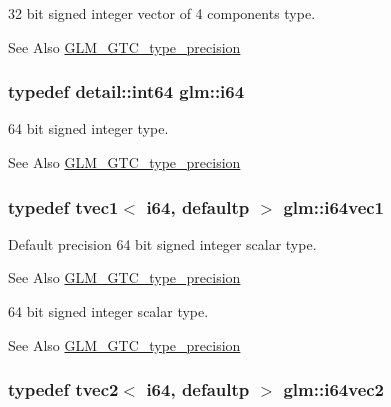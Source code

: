 32 bit signed integer vector of 4 components type. \begin{DoxySeeAlso}{See Also}
\hyperlink{group__gtc__type__precision}{G\-L\-M\-\_\-\-G\-T\-C\-\_\-type\-\_\-precision} 
\end{DoxySeeAlso}
\hypertarget{group__gtc__type__precision_gac7a7eaad46064fc952b06df33689da23}{
\subsubsection[{i64}]{\setlength{\rightskip}{0pt plus 5cm}typedef detail\-::int64 {\bf glm\-::i64}}}\label{group__gtc__type__precision_gac7a7eaad46064fc952b06df33689da23}
64 bit signed integer type. \begin{DoxySeeAlso}{See Also}
\hyperlink{group__gtc__type__precision}{G\-L\-M\-\_\-\-G\-T\-C\-\_\-type\-\_\-precision} 
\end{DoxySeeAlso}
\hypertarget{group__gtc__type__precision_ga7ee2c91a98ebd719ae26e15ad89106de}{
\subsubsection[{i64vec1}]{\setlength{\rightskip}{0pt plus 5cm}typedef tvec1$<$ i64, defaultp $>$ {\bf glm\-::i64vec1}}}\label{group__gtc__type__precision_ga7ee2c91a98ebd719ae26e15ad89106de}
Default precision 64 bit signed integer scalar type. \begin{DoxySeeAlso}{See Also}
\hyperlink{group__gtc__type__precision}{G\-L\-M\-\_\-\-G\-T\-C\-\_\-type\-\_\-precision}
\end{DoxySeeAlso}
64 bit signed integer scalar type. \begin{DoxySeeAlso}{See Also}
\hyperlink{group__gtc__type__precision}{G\-L\-M\-\_\-\-G\-T\-C\-\_\-type\-\_\-precision} 
\end{DoxySeeAlso}
\hypertarget{group__gtc__type__precision_ga5a03cb457be28a9a8b9e61163fe648a1}{
\subsubsection[{i64vec2}]{\setlength{\rightskip}{0pt plus 5cm}typedef tvec2$<$ i64, defaultp $>$ {\bf glm\-::i64vec2}}}\label{group__gtc__type__precision_ga5a03cb457be28a9a8b9e61163fe648a1}
